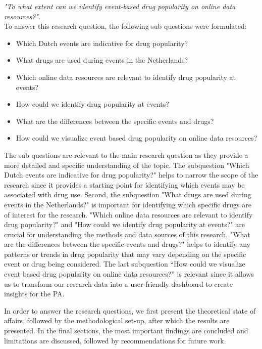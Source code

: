 \textit{"To what extent can we identify event-based drug popularity on online data resources?"}.\\

To answer this research question, the following sub questions were formulated:

\begin{itemize}
  \item Which Dutch events are indicative for drug popularity?
  \item What drugs are used during events in the Netherlands?
  \item Which online data resources are relevant to identify drug popularity at events?
  \item How could we identify drug popularity at events?
  \item What are the differences between the specific events and drugs?
  \item How could we visualize event based drug popularity on online data resources?
\end{itemize}

The sub questions are relevant to the main research question as they provide a more detailed and specific understanding of the topic. The subquestion "Which Dutch events are indicative for drug popularity?" helps to narrow the scope of the research since it provides a starting point for identifying which events may be associated with drug use. Second, the subquestion "What drugs are used during events in the Netherlands?" is important for identifying which specific drugs are of interest for the research. "Which online data resources are relevant to identify drug popularity?" and "How could we identify drug popularity at events?" are crucial for understanding the methods and data sources of this research. "What are the differences between the specific events and drugs?" helps to identify any patterns or trends in drug popularity that may vary depending on the specific event or drug being considered. The last subquestion “How could we visualize event based drug popularity on online data resources?” is relevant since it allows us to transform our research data into a user-friendly dashboard to create insights for the PA.

In order to answer the research questions, we first present the theoretical state of affairs, followed by the methodological set-up, after which the results are presented. In the final sections, the most important findings are concluded and limitations are discussed, followed by recommendations for future work.
